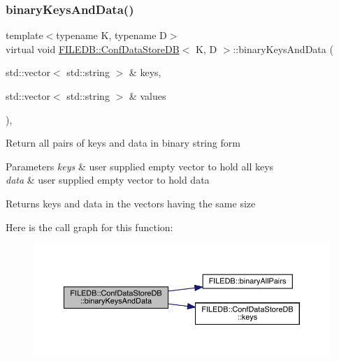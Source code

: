 \subsubsection{\texorpdfstring{binaryKeysAndData()}{binaryKeysAndData()}\hspace{0.1cm}{\footnotesize\ttfamily [3/3]}}
{\footnotesize\ttfamily template$<$typename K, typename D$>$ \\
virtual void \mbox{\hyperlink{classFILEDB_1_1ConfDataStoreDB}{F\+I\+L\+E\+D\+B\+::\+Conf\+Data\+Store\+DB}}$<$ K, D $>$\+::binary\+Keys\+And\+Data (\begin{DoxyParamCaption}\item[{std\+::vector$<$ std\+::string $>$ \&}]{keys,  }\item[{std\+::vector$<$ std\+::string $>$ \&}]{values }\end{DoxyParamCaption})\hspace{0.3cm}{\ttfamily [inline]}, {\ttfamily [virtual]}}

Return all pairs of keys and data in binary string form 
\begin{DoxyParams}{Parameters}
{\em keys} & user supplied empty vector to hold all keys \\
\hline
{\em data} & user supplied empty vector to hold data \\
\hline
\end{DoxyParams}
\begin{DoxyReturn}{Returns}
keys and data in the vectors having the same size 
\end{DoxyReturn}
Here is the call graph for this function\+:
\nopagebreak
\begin{figure}[H]
\begin{center}
\leavevmode
\includegraphics[width=350pt]{d8/d19/classFILEDB_1_1ConfDataStoreDB_ae38beaf9ba3f8629f2c322a3c5a23357_cgraph}
\end{center}
\end{figure}
\mbox{\label{classFILEDB_1_1ConfDataStoreDB_aa322ea0136b8eacc11df2b5b52b3b6d5}} 
